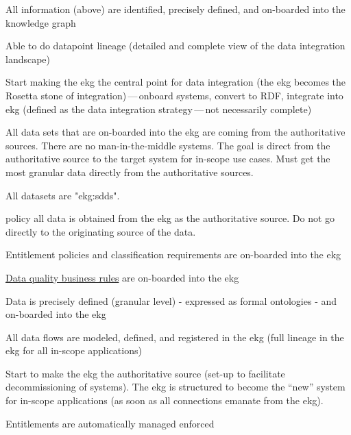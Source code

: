 \begin{scoring}

    \item All information (above) are identified, precisely defined, and on-boarded into the knowledge graph
    \item Able to do datapoint lineage (detailed and complete view of the data integration landscape)
    \item Start making the \gls{ekg} the central point for data integration (the \gls{ekg} becomes the Rosetta stone of
          integration)\,---\,onboard systems, convert to RDF, integrate into \gls{ekg} (defined as the
          data integration strategy\,---\,not necessarily complete)
    \item All data sets that are on-boarded into the \gls{ekg} are coming from the authoritative sources.
          There are no man-in-the-middle systems.
          The goal is direct from the authoritative source to the target system for in-scope use cases.
          Must get the most granular data directly from the authoritative sources.
    \item All datasets are "\glspl{ekg:sdd}".
    \item [policy] all data is obtained from the \gls{ekg} as the authoritative source.
          Do not go directly to the originating source of the data.
    \item Entitlement policies and classification requirements are on-boarded into the \gls{ekg}
    \item \hyperref[sec:ekg-mm-data-quality-business-rules]{Data quality business rules}
          are on-boarded into the \gls{ekg}

\end{scoring}

\kgmmscoringlevelThree

\begin{scoring}

    \item Data is precisely defined (granular level) - expressed as formal ontologies - and on-boarded into the \gls{ekg}
    \item All data flows are modeled, defined, and registered in the \gls{ekg} (full lineage in the \gls{ekg} for all
          in-scope applications)
    \item Start to make the \gls{ekg} the authoritative source (set-up to facilitate decommissioning of systems).
          The \gls{ekg} is structured to become the “new” system for in-scope applications (as soon as all
          connections emanate from the \gls{ekg}).
    \item Entitlements are automatically managed enforced

\end{scoring}


